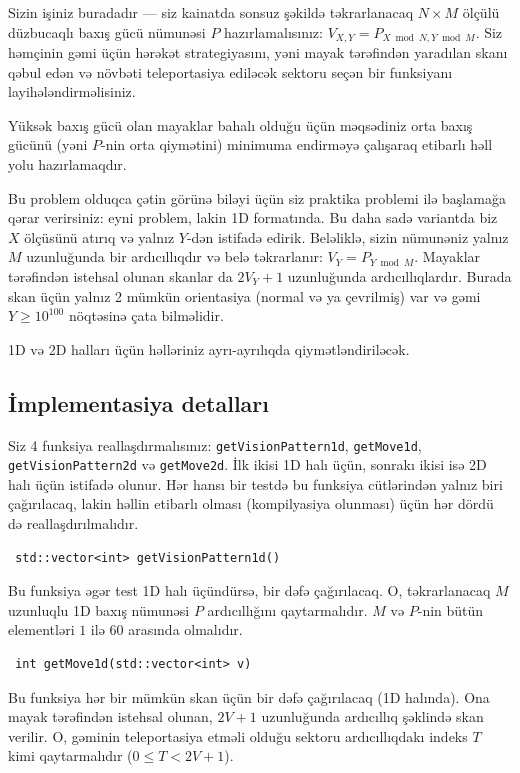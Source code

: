 \documentclass[12pt]{article}
\begin{document}
Sizin işiniz buradadır — siz kainatda sonsuz şəkildə təkrarlanacaq $N \times M$ ölçülü düzbucaqlı baxış gücü nümunəsi $P$ hazırlamalısınız: $V_{X, Y} = P_{X \bmod N, Y \bmod M}$. Siz həmçinin gəmi üçün hərəkət strategiyasını, yəni mayak tərəfindən yaradılan skanı qəbul edən və növbəti teleportasiya ediləcək sektoru seçən bir funksiyanı layihələndirməlisiniz.

Yüksək baxış gücü olan mayaklar bahalı olduğu üçün məqsədiniz orta baxış gücünü (yəni $P$-nin orta qiymətini) minimuma endirməyə çalışaraq etibarlı həll yolu hazırlamaqdır.

Bu problem olduqca çətin görünə biləyi üçün siz praktika problemi ilə başlamağa qərar verirsiniz: eyni problem, lakin 1D formatında. Bu daha sadə variantda biz $X$ ölçüsünü atırıq və yalnız $Y$-dən istifadə edirik. Beləliklə, sizin nümunəniz yalnız $M$ uzunluğunda bir ardıcıllıqdır və belə təkrarlanır: $V_Y = P_{Y \bmod M}$. Mayaklar tərəfindən istehsal olunan skanlar da $2V_Y + 1$ uzunluğunda ardıcıllıqlardır. Burada skan üçün yalnız 2 mümkün orientasiya (normal və ya çevrilmiş) var və gəmi $Y \geq 10^{100}$ nöqtəsinə çata bilməlidir.

1D və 2D halları üçün həlləriniz ayrı-ayrılıqda qiymətləndiriləcək.

\subsection{İmplementasiya detalları}

Siz 4 funksiya reallaşdırmalısınız: \verb|getVisionPattern1d|, \verb|getMove1d|, \verb|getVisionPattern2d| və \verb|getMove2d|. İlk ikisi 1D halı üçün, sonrakı ikisi isə 2D halı üçün istifadə olunur. Hər hansı bir testdə bu funksiya cütlərindən yalnız biri çağırılacaq, lakin həllin etibarlı olması (kompilyasiya olunması) üçün hər dördü də reallaşdırılmalıdır.

\begin{lstlisting}
 std::vector<int> getVisionPattern1d()
\end{lstlisting}

Bu funksiya əgər test 1D halı üçündürsə, bir dəfə çağırılacaq. O, təkrarlanacaq $M$ uzunluqlu 1D baxış nümunəsi $P$ ardıcıllığını qaytarmalıdır. $M$ və $P$-nin bütün elementləri $1$ ilə $60$ arasında olmalıdır.

\begin{lstlisting}
 int getMove1d(std::vector<int> v)
\end{lstlisting}

Bu funksiya hər bir mümkün skan üçün bir dəfə çağırılacaq (1D halında). Ona mayak tərəfindən istehsal olunan, $2V + 1$ uzunluğunda ardıcıllıq şəklində skan verilir. O, gəminin teleportasiya etməli olduğu sektoru ardıcıllıqdakı indeks $T$ kimi qaytarmalıdır ($0 \leq T < 2V + 1$).
\end{document}
